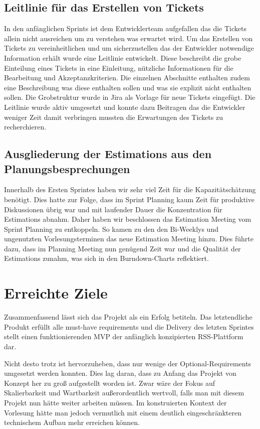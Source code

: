 \subsection{Leitlinie für das Erstellen von Tickets}
In den anfänglichen Sprints ist dem Entwicklerteam aufgefallen das die Tickets allein nicht ausreichen 
um zu verstehen was erwartet wird. Um das Erstellen von Tickets zu vereinheitlichen und um sicherzustellen 
das der Entwickler notwendige Information erhält wurde eine Leitlinie entwickelt. 
Diese beschreibt die grobe Einteilung eines Tickets in eine Einleitung, nützliche Informationen für die 
Bearbeitung und Akzeptanzkriterien. Die einzelnen Abschnitte enthalten zudem eine Beschreibung was diese 
enthalten sollen und was sie explizit nicht enthalten sollen. Die Grobstruktur wurde in Jira als Vorlage 
für neue Tickets eingefügt.
Die Leitlinie wurde aktiv umgesetzt und konnte dazu Beitragen das die Entwickler weniger Zeit damit 
verbringen mussten die Erwartungen des Tickets zu recherchieren. 

\subsection{Ausgliederung der Estimations aus den Planungsbesprechungen}

Innerhalb des Ersten Sprintes haben wir sehr viel Zeit für die Kapazitätschätzung benötigt. 
Dies hatte zur Folge, dass im Sprint Planning kaum Zeit für produktive Diskussionen übrig war und mit laufender Dauer die Konzentration für Estimations abnahm.
Daher haben wir beschlossen das Estimation Meeting vom Sprint Planning zu entkoppeln.
So kamen zu den den Bi-Weeklys und ungenutzten Vorlesungsterminen das neue Estimation Meeting hinzu.
Dies führte dazu, dass im Planning Meeting nun genügend Zeit war und die Qualität der Estimations zunahm, was sich in den Burndown-Charts reflektiert.

\section{Erreichte Ziele}
Zusammenfassend lässt sich das Projekt als ein Erfolg betiteln.
Das letztendliche Produkt erfüllt alle must-have requirements und die Delivery des letzten Sprintes stellt einen funktionierenden \ac{MVP} der anfänglich konzipierten RSS-Plattform dar.

Nicht desto trotz ist hervorzuheben, dass nur wenige der Optional-Requirements umgesetzt werden konnten.
Dies lag daran, dass zu Anfang das Projekt von Konzept her zu groß aufgestellt worden ist.
Zwar wäre der Fokus auf Skalierbarkeit und Wartbarkeit außerordentlich wertvoll, falls man mit diesem Projekt nun hätte weiter arbeiten müssen.
Im konstruierten Kontext der Vorlesung hätte man jedoch vermutlich mit einem deutlich eingeschränkteren technischem Aufbau mehr erreichen können.


